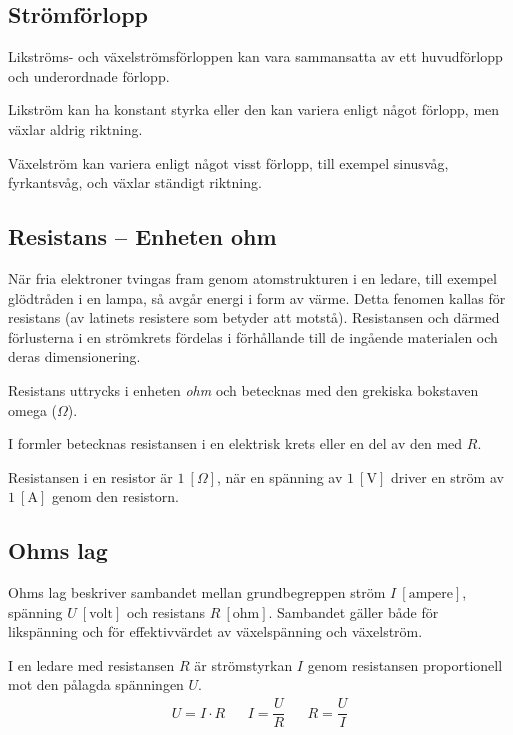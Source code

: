 \subsection{Strömförlopp}
\frdjp
{}

Likströms- och växelströmsförloppen kan vara sammansatta av ett huvudförlopp och
underordnade förlopp.

Likström kan ha konstant styrka eller den kan variera enligt något förlopp, men
växlar aldrig riktning.

Växelström kan variera enligt något visst förlopp, till exempel sinusvåg,
fyrkantsvåg, och växlar ständigt riktning.

\subsection{Resistans -- Enheten ohm}

När fria elektroner tvingas fram genom atomstrukturen i en ledare, till exempel
glödtråden i en lampa, så avgår energi i form av värme.
Detta fenomen kallas för resistans (av latinets resistere som betyder att
motstå).
Resistansen och därmed förlusterna i en strömkrets fördelas i
förhållande till de ingående materialen och deras dimensionering.

Resistans uttrycks i enheten \emph{ohm} \cite{SIbrochure8} och betecknas med
den grekiska bokstaven omega (\(\Omega\)).

I formler betecknas resistansen i en elektrisk krets eller en del av den med
\(R\).

Resistansen i en resistor är \(1\ [\Omega]\), när en spänning av \(1\ \mathrm{[V]}\)
driver en ström av \(1\ \mathrm{[A]}\) genom den resistorn.

\subsection{Ohms lag}

Ohms lag beskriver sambandet mellan grundbegreppen ström
\(I\ \mathrm{[ampere]}\), spänning \(U\ \mathrm{[volt]}\) och resistans
\(R\ \mathrm{[ohm]}\).
Sambandet gäller både för likspänning och för effektivvärdet av växelspänning och
växelström.

I en ledare med resistansen \(R\) är strömstyrkan \(I\) genom resistansen
proportionell mot den pålagda spänningen \(U\).
\[
\begin{array}{lllll}U=I \cdot R & & I=\dfrac{U}{R} & & R=\dfrac{U}{I}\end{array}
\]
